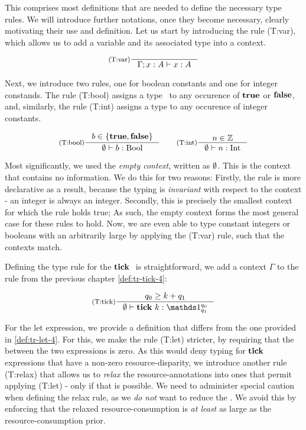 This comprises most definitions that are needed to define the necessary type rules. We will introduce further notations, once they become necessary, clearly motivating their use and definition. Let us start by introducing the rule (T:var), which allows us to add a variable and its associated type into a context.

\[
   \inference[(T:var)]
   {}
   {\typing{\Gamma; x: A}{x}{A}}
\]

Next, we introduce two rules, one for boolean constants and one for integer constands. The rule (T:bool) assigns a type \bool~to any occurence of \(\mathbf{true}\) or \(\mathbf{false}\), and, similarly, the rule (T:int) assigns a type \typeint to any occurence of integer constants.

\[
   \inference[(T:bool)]
   {b \in \{\true, \false\}}
   {\typing{\emptycontext}{b}{\text{\bool}}}%
   \qquad
   \inference[(T:int)]
   {n \in \mathbb{Z}}
   {\typing{\emptycontext}{n}{\text{\typeint}}}
\]

Most significantly, we used the \emph{empty context}, written as \(\emptyset\). This is the context that contains no information. We do this for two reasons: Firstly, the rule is more declarative as a result, because the typing is \emph{invariant} with respect to the context - an integer is always an integer. Secondly, this is precisely the smallest context for which the rule holds true; As such, the empty context forms the most general case for these rules to hold. Now, we are even able to type constant integers or booleans with an arbitrarily large  by applying the (T:var) rule, such that the contexts match. 

Defining the type rule for the \(\mathbf{tick}~\) is straightforward, we add a context \(\Gamma\) to the rule from the previous chapter \cref{def:tr-tick-4}:

\[
   \inference[(T:tick)]
   {q_0 \geq k + q_1}
   {\typing{\emptycontext}{\tick{k}}{\ratype{\unit}{q_0}{q_1}}}
\]

For the let expression, we provide a definition that differs from the one provided in \cref{def:tr-let-4}. For this, we make the rule (T:let) stricter, by requiring that the  between the two expressions is zero. As this would deny typing for \(\mathbf{tick}~\) expressions that have a non-zero resource-disparity, we introduce another rule (T:relax) that allows us to \emph{relax} the resource-annotations into ones that permit applying (T:let) - only if that is possible. 
We need to administer special caution when defining the relax rule, as we \emph{do not} want to reduce the . We avoid this by enforcing that the relaxed resource-consumption is \emph{at least} as large as the resource-consumption prior.

